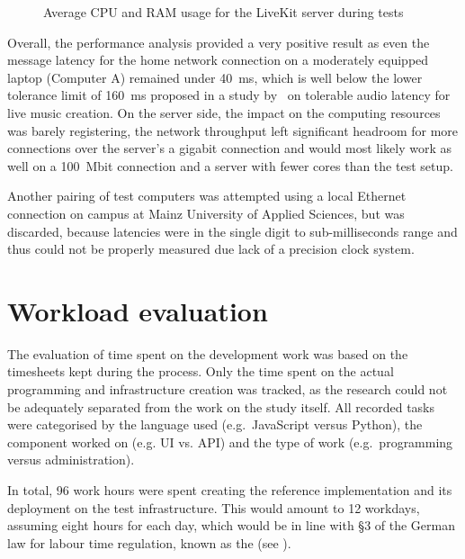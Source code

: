 \begin{figure*}[!ht]
\hfill

\caption[Server compute resources usage during tests]{Average \ac{CPU} and \ac{RAM} usage for the LiveKit server during tests\protect}
\label{fig:serverComputeResources}
\end{figure*}

Overall, the performance analysis provided a very positive result as even the message latency for the home network connection on a moderately equipped laptop (Computer A) remained under 40~\ac{ms}, which is well below the lower tolerance limit of 160~\ac{ms} proposed in a study by~\cite{audioLatency} on tolerable audio latency for live music creation.
On the server side, the impact on the computing resources was barely registering, the network throughput left significant headroom for more connections over the server's a gigabit connection and would most likely work as well on a 100~\ac{Mbit} connection and a server with fewer cores than the test setup.

Another pairing of test computers was attempted using a local Ethernet connection on campus at Mainz University of Applied Sciences, but was discarded, because latencies were in the single digit to sub-milliseconds range and thus could not be properly measured due lack of a precision clock system.

\section{Workload evaluation}\label{sec:workload-evaluation}

The evaluation of time spent on the development work was based on the timesheets kept during the process.
Only the time spent on the actual programming and infrastructure creation was tracked, as the research could not be adequately separated from the work on the study itself.
All recorded tasks were categorised by the language used (e.g.\ JavaScript versus Python), the component worked on (e.g. \ac{UI} vs. \ac{API}) and the type of work (e.g.\ programming versus administration).

In total, 96 work hours were spent creating the reference implementation and its deployment on the test infrastructure.
This would amount to 12 workdays, assuming eight hours for each day, which would be in line with §3 of the German law for labour time regulation, known as the  (see \parencite{abzgPar3}).

